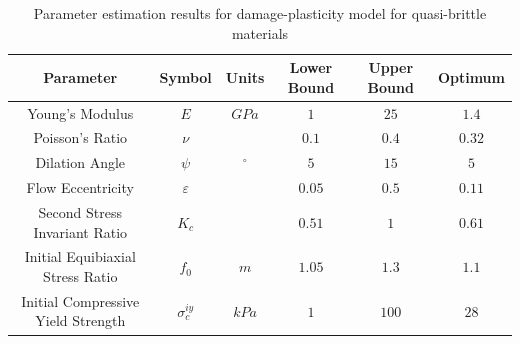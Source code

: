 \begin{table}[!htb]

\centering
\caption{{Parameter estimation results for damage-plasticity model for quasi-brittle materials}}
\label{tab:paramConcrete}
\begin{tabulary}{\textwidth}{@{}cCcCCC@{}}
\toprule
\textbf{Parameter}                 & \textbf{Symbol}                  & \textbf{Units} & \textbf{Lower Bound} & \textbf{Upper Bound} & \textbf{Optimum} \\ \midrule
Young's Modulus                    & $E$                              & $GPa$          & $1$                                                             & $25$                                                            & $1.4$                                                             \\
Poisson's Ratio                    & $\nu$                            &                & $0.1$                                                           & $0.4$                                                           & $0.32$                                                            \\
Dilation Angle                     & $\psi$                           & $^{\circ}$     & $5$                                                             & $15$                                                            & $5$                                                              \\
Flow Eccentricity                  & $\varepsilon$                              &                & $0.05$                                                          & $0.5$                                                             & $0.11$                                                            \\
Second Stress Invariant Ratio                     & $K_c$                          &      & $0.51$                                                            & $1$                                                            & $0.61$                                                              \\
Initial Equibiaxial Stress Ratio    & $f_0$                 & $m$            & $1.05$                                                          & $1.3$                                                             & $1.1$                                                            \\ 
Initial Compressive Yield Strength & $\sigma_c^{iy}$                  & $kPa$          & $1$                                                             & $100$                                                           & $28$                                                              \\

\end{tabulary}
\end{table}
